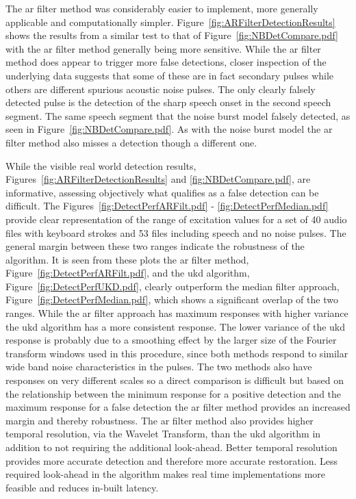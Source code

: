 The \gls{ar} filter method was considerably easier to implement, more generally applicable and computationally simpler. Figure~\ref{fig:ARFilterDetectionResults} shows the results from a similar test to that of Figure~\ref{fig:NBDetCompare.pdf} with the \gls{ar} filter method generally being more sensitive. While the \gls{ar} filter method does appear to trigger more false detections, closer inspection of the underlying data suggests that some of these are in fact secondary pulses while others are different spurious acoustic noise pulses. The only clearly falsely detected pulse is the detection of the sharp speech onset in the second speech segment. The same speech segment that the noise burst model falsely detected, as seen in Figure~\ref{fig:NBDetCompare.pdf}. As with the noise burst model the \gls{ar} filter method also misses a detection though a different one.

While the visible real world detection results, Figures~\ref{fig:ARFilterDetectionResults} and \ref{fig:NBDetCompare.pdf}, are informative, assessing objectively what qualifies as a false detection can be difficult. The Figures~\ref{fig:DetectPerfARFilt.pdf} - \ref{fig:DetectPerfMedian.pdf} provide clear representation of the range of excitation values for a set of 40 audio files with keyboard strokes and 53 files including speech and no noise pulses. The general margin between these two ranges indicate the robustness of the algorithm. It is seen from these plots the \gls{ar} filter method, Figure~\ref{fig:DetectPerfARFilt.pdf}, and the \gls{ukd} algorithm, Figure~\ref{fig:DetectPerfUKD.pdf}, clearly outperform the median filter approach, Figure~\ref{fig:DetectPerfMedian.pdf}, which shows a significant overlap of the two ranges. While the \gls{ar} filter approach has maximum responses with higher variance the \gls{ukd} algorithm has a more consistent response. The lower variance of the \gls{ukd} response is probably due to a smoothing effect by the larger size of the Fourier transform windows used in this procedure, since both methods respond to similar wide band noise characteristics in the pulses. The two methods also have responses on very different scales so a direct comparison is difficult but based on the relationship between the minimum response for a positive detection and the maximum response for a false detection the \gls{ar} filter method provides an increased margin and thereby robustness. The \gls{ar} filter method also provides higher temporal resolution, via the Wavelet Transform, than the \gls{ukd} algorithm in addition to not requiring the additional look-ahead. Better temporal resolution provides more accurate detection and therefore more accurate restoration. Less required look-ahead in the algorithm makes real time implementations more feasible and reduces in-built latency.

